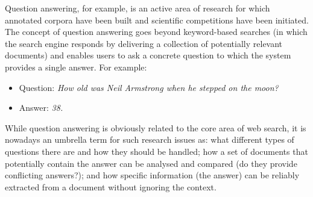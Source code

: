 \begin{multicols}{2}

Question answering, for example, is an active area of research for which annotated corpora have been built and scientific competitions have been initiated.
The concept of question answering goes beyond keyword-based searches (in which the search engine responds by delivering a collection of potentially relevant documents) and enables users to ask a concrete question to which the system provides a single answer.
For example:
\begin{itemize}
\item[] Question: \textit{How old was Neil Armstrong when he stepped on the moon?}
\item[] Answer: \textit{38.}
\end{itemize}

While question answering is obviously related to the core area of web search, it is nowadays an umbrella term for such research issues as: what different types of questions there are and how they should be handled; how a set of documents that potentially contain the answer can be analysed and compared (do they provide conflicting answers?); and how specific information (the answer) can be reliably extracted from a document without ignoring the context. 


\end{multicols}
